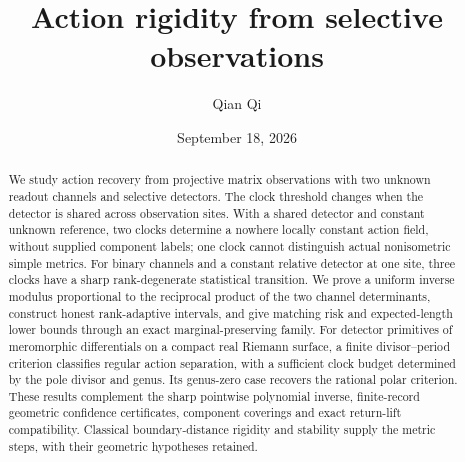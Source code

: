 \documentclass[11pt,reqno]{amsart}
\title[Action rigidity from selective observations]{Action rigidity from selective observations}
\author{Qian Qi}
\date{September 18, 2026}
\numberwithin{equation}{section}
\theoremstyle{definition}\newtheorem{definition}[theorem]{Definition}
\theoremstyle{remark}\newtheorem{remark}[theorem]{Remark}
\begin{document}
\begin{abstract}
We study action recovery from projective matrix observations with two
unknown readout channels and selective detectors. The clock threshold
changes when the detector is shared across observation sites. With a
shared detector and constant unknown reference, two clocks determine a
nowhere locally constant action field, without supplied component labels;
one clock cannot distinguish actual nonisometric simple metrics. For
binary channels and a constant relative detector at one site, three
clocks have a sharp rank-degenerate statistical transition. We prove a
uniform inverse modulus proportional to the reciprocal product of the
two channel determinants, construct honest rank-adaptive intervals,
and give matching risk and expected-length lower bounds through an
exact marginal-preserving family. For detector primitives of meromorphic
differentials on a compact real Riemann surface, a finite divisor--period
criterion classifies regular action separation, with a sufficient clock
budget determined by the pole divisor and genus. Its genus-zero case
recovers the rational polar criterion. These results complement the
sharp pointwise polynomial inverse, finite-record geometric confidence
certificates, component coverings and exact return-lift compatibility.
Classical boundary-distance rigidity and stability supply the metric
steps, with their geometric hypotheses retained.
\end{abstract}
\maketitle
\setcounter{tocdepth}{1}
\tableofcontents
\end{document}

